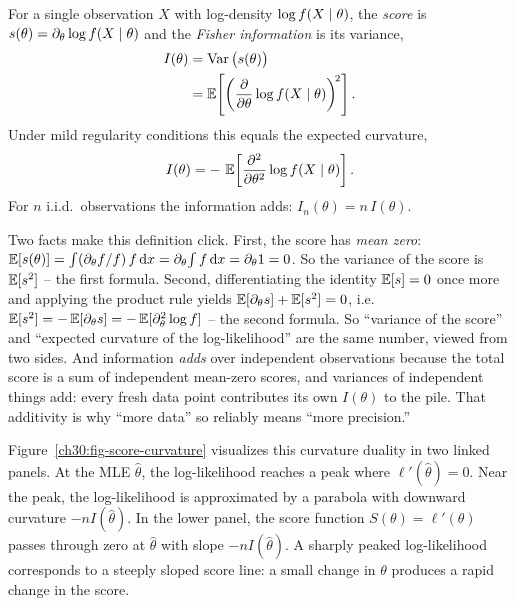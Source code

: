 \begin{definition}
\label{ch30:def-fisher}
For a single observation $X$ with log-density $\log f(X\mid\theta)$, the
\emph{score} is $s(\theta)=\partial_\theta \log f(X\mid\theta)$ and the
\emph{Fisher information} is its variance,
\begin{align*}
  I(\theta) &= \operatorname{Var}\big(s(\theta)\big) \\
            &= \operatorname{\mathbb{E}}\!\left[\left(\frac{\partial}{\partial\theta}\log f(X\mid\theta)\right)^{\!2}\right].
\end{align*}
Under mild regularity conditions this equals the expected curvature,
\[
  I(\theta) = -\,\operatorname{\mathbb{E}}\!\left[\frac{\partial^2}{\partial\theta^2}\log f(X\mid\theta)\right].
\]
For $n$ i.i.d.\ observations the information adds: $I_n(\theta)=n\,I(\theta)$.
\end{definition}

\begin{whybox}
Two facts make this definition click. First, the score has \emph{mean zero}:
$\operatorname{\mathbb{E}}[s(\theta)]=\int (\partial_\theta f/f)\,f\,\mathrm{d} x
= \partial_\theta\!\int f\,\mathrm{d} x = \partial_\theta 1 = 0$. So the variance of the
score is $\operatorname{\mathbb{E}}[s^2]$ -- the first formula. Second, differentiating the
identity $\operatorname{\mathbb{E}}[s]=0$ once more and applying the product rule yields
$\operatorname{\mathbb{E}}[\partial_\theta s] + \operatorname{\mathbb{E}}[s^2]=0$, i.e.\
$\operatorname{\mathbb{E}}[s^2] = -\operatorname{\mathbb{E}}[\partial_\theta s] = -\operatorname{\mathbb{E}}[\partial_\theta^2 \log f]$ -- the second
formula. So ``variance of the score'' and ``expected curvature of the
log-likelihood'' are the same number, viewed from two sides. And information
\emph{adds} over independent observations because the total score is a sum of
independent mean-zero scores, and variances of independent things add: every
fresh data point contributes its own $I(\theta)$ to the pile. That additivity is
why ``more data'' so reliably means ``more precision.''
\end{whybox}

Figure~\ref{ch30:fig-score-curvature} visualizes this curvature duality in two linked panels. At the MLE $\hat\theta$, the log-likelihood reaches a peak where $\ell'(\hat\theta) = 0$. Near the peak, the log-likelihood is approximated by a parabola with downward curvature $-n I(\hat\theta)$. In the lower panel, the score function $S(\theta) = \ell'(\theta)$ passes through zero at $\hat\theta$ with slope $-n I(\hat\theta)$. A sharply peaked log-likelihood corresponds to a steeply sloped score line: a small change in $\theta$ produces a rapid change in the score.

